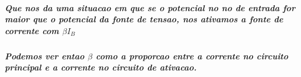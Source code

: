 \documentclass[12pt,twoside, a4paper, twocolumn]{article}
\begin{document}
\subparagraph*{Que nos da uma situacao em que se o potencial no no de entrada for maior que o potencial da fonte de tensao, nos ativamos a fonte de corrente com $\beta I_B$}

\subparagraph*{Podemos ver entao $\beta$ como a proporcao entre a corrente no circuito principal e a corrente no circuito de ativacao.}
\end{document}

